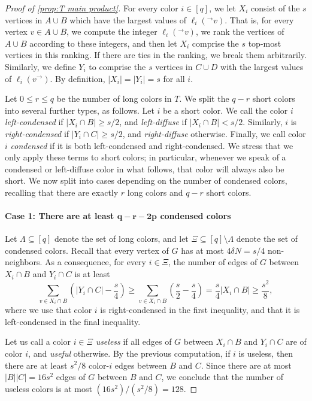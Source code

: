 \documentclass[10pt,a4paper]{amsart}
\newcommand\ab[1]{\lvert#1\rvert}
\begin{document}
\begin{proof}[Proof of \cref{prop:T main product}]
    For every color $i \in [q]$, we let $X_i$ consist of the $s$ vertices in $A \cup B$ which have the largest values of $\ell_i({}^\to v)$. That is, for every vertex $v \in A \cup B$, we compute the integer $\ell_i(^\to v)$, we rank the vertices of $A \cup B$ according to these integers, and then let $X_i$ comprise the $s$ top-most vertices in this ranking. If there are ties in the ranking, we break them arbitrarily. Similarly, we define $Y_i$ to comprise the $s$ vertices in $C \cup D$ with the largest values of $\ell_i(v^\to)$. By definition, $\ab{X_i}=\ab{Y_i}=s$ for all $i$. 

    

    Let $0\leq r\leq q$ be the number of long colors in $T$. We split the $q-r$ short colors into several further types, as follows.
    Let $i$ be a short color. We call the color $i$ \emph{left-condensed} if $\ab{X_i \cap B} \geq s/2$, and \emph{left-diffuse} if $\ab{X_i\cap B}<s/2$. Similarly, $i$ is \emph{right-condensed} if $\ab{Y_i\cap C}\geq s/2$, and \emph{right-diffuse} otherwise. Finally, we call color $i$ \emph{condensed} if it is both left-condensed and right-condensed. We stress that we only apply these terms to short colors; in particular, whenever we speak of a condensed or left-diffuse color in what follows, that color will always also be short. 
    We now split into cases depending on the number of condensed colors, recalling that there are exactly $r$ long colors and $q-r$ short colors. 

    \paragraph{\bf Case 1: There are at least $\bm{q-r-2p}$ condensed colors} 
    Let $\Lambda \subseteq [q]$ denote the set of long colors, and let $\Xi \subseteq [q] \setminus \Lambda$ denote the set of condensed colors.
    Recall that every vertex of $G$ has at most $4\delta N = s/4$ non-neighbors. As a consequence, for every $i \in \Xi$, the number of edges of $G$ between $X_i \cap B$ and $Y_i \cap C$ is at least
    \[
        \sum_{v \in X_i \cap B} \left(\ab{Y_i \cap C}-\frac s4\right) \geq \sum_{v \in X_i\cap B} \left( \frac s2-\frac s4 \right) =\frac s4 \ab{X_i \cap B} \geq \frac{s^2}{8},
    \]
    where we use that color $i$ is right-condensed in the first inequality, and that it is left-condensed in the final inequality.
    
    Let us call a color $i \in \Xi$ \emph{useless} if all edges of $G$ between $X_i \cap B$ and $Y_i \cap C$ are of color $i$, and \emph{useful} otherwise. By the previous computation, if $i$ is useless, then there are at least $s^2/8$ color-$i$ edges between $B$ and $C$. Since there are at most $\ab B \ab C = 16s^2$ edges of $G$ between $B$ and $C$, we conclude that the number of useless colors is at most $(16s^2)/(s^2/8)=128$. 


\end{proof}
\end{document}
